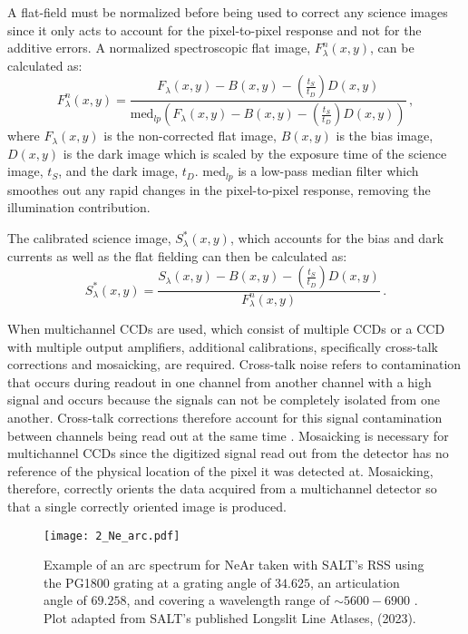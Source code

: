 A flat-field must be normalized before being used to correct any science images since it only acts to account for the pixel-to-pixel response and not for the additive errors. A  normalized spectroscopic flat image, $F^{n}_{\lambda}(x,y)$, can be calculated as:
\begin{equation} \label{eq:norm_flat}
    F^{n}_{\lambda}(x,y) = \frac{F_{\lambda}(x,y) - B(x,y) - (\frac{t_{S}}{t_{D}})D(x,y)}{\text{med}_{lp}(F_{\lambda}(x,y) - B(x,y) - (\frac{t_{S}}{t_{D}})D(x,y))}\,,
\end{equation}
where $F_{\lambda}(x,y)$ is the non-corrected flat image, $B(x,y)$ is the bias image, $D(x,y)$ is the dark image which is scaled by the exposure time of the science image, $t_{S}$, and the dark image, $t_{D}$. med$_{lp}$ is a low-pass median filter which smoothes out any rapid changes in the pixel-to-pixel response, removing the illumination contribution.

The calibrated science image, $S^{*}_{\lambda}(x,y)$, which accounts for the bias and dark currents as well as the flat fielding can then be calculated as:
\begin{equation} \label{eq:science_cal}
    S^{*}_{\lambda}(x,y) = \frac{S_{\lambda}(x,y) - B(x,y) - (\frac{t_{S}}{t_{D}})D(x,y)}{F^{n}_{\lambda}(x,y)}\,.
\end{equation}

When multichannel \glspl{CCD} are used, which consist of multiple \glspl{CCD} or a \gls{CCD} with multiple output amplifiers, additional calibrations, specifically cross-talk corrections and mosaicking, are required. Cross-talk noise refers to contamination that occurs during readout in one channel from another channel with a high signal and occurs because the signals can not be completely isolated from one another. Cross-talk corrections therefore account for this signal contamination between channels being read out at the same time \citep{CrossTalk}. Mosaicking is necessary for multichannel \glspl{CCD} since the digitized signal read out from the detector has no reference of the physical location of the pixel it was detected at. Mosaicking, therefore, correctly orients the data acquired from a multichannel detector so that a single correctly oriented image is produced.

\begin{figure}[t]
    \centering
    \texttt{[image: 2\_Ne\_arc.pdf]}
    \caption{Example of an arc spectrum for NeAr taken with \gls{SALT}'s \gls{RSS} using the PG1800 grating at a grating angle of $34.625$\degr, an articulation angle of $69.258$\degr, and covering a wavelength range of $\sim5600 - 6900$ \angstrom. Plot adapted from \gls{SALT}'s published Longslit Line Atlases, (2023).\protect\footnotemark}
    \label{fig:Ne_arc}
\end{figure}


